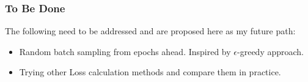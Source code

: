 \documentclass{beamer}
\begin{document}
\begin{frame}
    \frametitle{To Be Done}
    The following need to be addressed and are proposed here as my future path:
    \begin{itemize}
        \item Random batch sampling from epochs ahead. Inspired by $\epsilon$-greedy approach.
        \item Trying other Loss calculation methods and compare them in practice.
    \end{itemize}
\end{frame}



\end{document}
